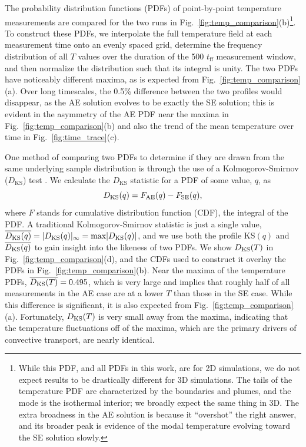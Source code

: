 The probability distribution functions (PDFs) of point-by-point temperature measurements are compared for the two runs in Fig.~\ref{fig:temp_comparison}(b)\footnote{
While this PDF, and all PDFs in this work, are for 2D simulations, we do not expect results to be drastically different for 3D simulations.
The tails of the temperature PDF are characterized by the boundaries and plumes, and the mode is the isothermal interior; we broadly expect the same thing in 3D.
The extra broadness in the AE solution is because it ``overshot'' the right answer, and its broader peak is evidence of the modal temperature evolving toward the SE solution slowly.
}. 
To construct these PDFs, we interpolate the full temperature field at each measurement time onto an evenly spaced grid, determine the frequency distribution of all $T$ values over the duration of the 500 $t_{\text{ff}}$ measurement window, and then normalize the distribution such that its integral is unity.  
The two PDFs have noticeably different maxima, as is expected from Fig.~\ref{fig:temp_comparison}(a). 
Over long timescales, the 0.5\% difference between the two profiles would disappear, as the AE solution evolves to be exactly the SE solution; this is evident in the asymmetry of the AE PDF near the maxima in Fig.~\ref{fig:temp_comparison}(b) and also the trend of the mean temperature over time in Fig.~\ref{fig:time_trace}(c).

One method of comparing two PDFs to determine if they are drawn from the same underlying sample distribution is through the use of a Kolmogorov-Smirnov ($D_{\text{KS}}$) test \citep{wall&jenkins2012}.
We calculate the $D_{\text{KS}}$ statistic for a PDF of some value, $q$, as
\begin{equation}
D_{\text{KS}}(q) = F_{\text{AE}}(q) - F_{\text{SE}}(q),
\label{eqn:abo18ks_profile}
\end{equation}
where $F$ stands for cumulative distribution function (CDF), the integral of the PDF.
A traditional Kolmogorov-Smirnov statistic is just a single value, $\overline{D_\text{KS}(q)} = |D_{\text{KS}}(q)|_\infty = \text{max} |D_{\text{KS}}(q)|$, and we use both the profile KS$(q)$ and $\overline{D_\text{KS}(q)}$ to gain insight into the likeness of two PDFs. 
We show $D_{\text{KS}}(T)$ in Fig.~\ref{fig:temp_comparison}(d), and the CDFs used to construct it overlay the PDFs in Fig.~\ref{fig:temp_comparison}(b).
Near the maxima of the temperature PDFs, $\overline{D_\text{KS}(T)} = 0.495$, which is very large and implies that roughly half of all measurements in the AE case are at a lower $T$ than those in the SE case.
While this difference is significant, it is also expected from Fig.~\ref{fig:temp_comparison}(a).
Fortunately, $D_{\text{KS}}(T)$ is very small away from the maxima, indicating that the temperature fluctuations off of the maxima, which are the primary drivers of convective transport, are nearly identical.

